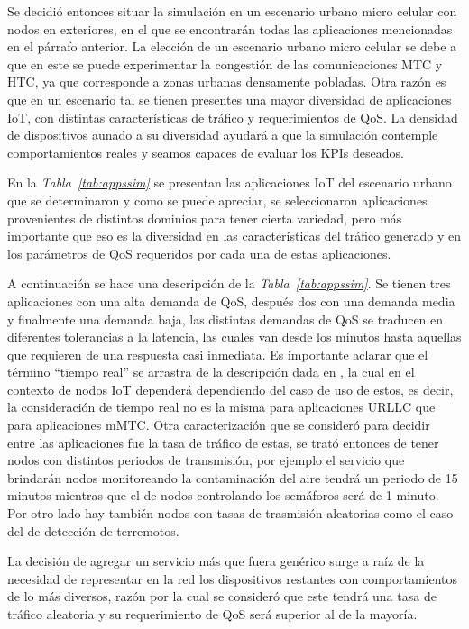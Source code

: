 Se decidió entonces situar la simulación en un escenario urbano micro celular con nodos en exteriores, en el que se encontrarán todas las aplicaciones mencionadas en el párrafo anterior. La elección de un escenario urbano micro celular se debe a que en este se puede experimentar la congestión de las comunicaciones MTC y HTC, ya que corresponde a zonas urbanas densamente pobladas. Otra razón es que en un escenario tal se tienen presentes una mayor diversidad de aplicaciones IoT, con distintas características de tráfico y requerimientos de QoS. La densidad de dispositivos aunado a su diversidad ayudará a que la simulación contemple comportamientos reales y seamos capaces de evaluar los KPIs deseados.\newline

En la \textit{Tabla~\ref{tab:appssim}} se presentan las aplicaciones IoT del escenario urbano que se determinaron y como se puede apreciar, se seleccionaron aplicaciones provenientes de distintos dominios para tener cierta variedad, pero más importante que eso es la diversidad en las características del tráfico generado y en los parámetros de QoS requeridos por cada una de estas aplicaciones. \newline

A continuación se hace una descripción de la \textit{Tabla~\ref{tab:appssim}}. Se tienen tres aplicaciones con una alta demanda de QoS, después dos con una demanda media y finalmente una demanda baja, las distintas demandas de QoS se traducen en diferentes tolerancias a la latencia, las cuales van desde los minutos hasta aquellas que requieren de una respuesta casi inmediata. Es importante aclarar que el término ``tiempo real'' se arrastra de la descripción dada en \parencite{NetTrafficIoT}, la cual en el contexto de nodos IoT dependerá dependiendo del caso de uso de estos, es decir, la consideración de tiempo real no es la misma para aplicaciones URLLC que para aplicaciones mMTC. Otra caracterización que se consideró para decidir entre las aplicaciones fue la tasa de tráfico de estas, se trató entonces de tener nodos con distintos periodos de transmisión, por ejemplo el servicio que brindarán nodos monitoreando la contaminación del aire tendrá un periodo de 15 minutos mientras que el de nodos controlando los semáforos será de 1 minuto. Por otro lado hay también nodos con tasas de trasmisión aleatorias como el caso del de detección de terremotos. \newline

La decisión de agregar un servicio más que fuera genérico surge a raíz de la necesidad de representar en la red los dispositivos restantes con comportamientos de lo más diversos, razón por la cual se consideró que este tendrá una tasa de tráfico aleatoria y su requerimiento de QoS será superior al de la mayoría.\newline

